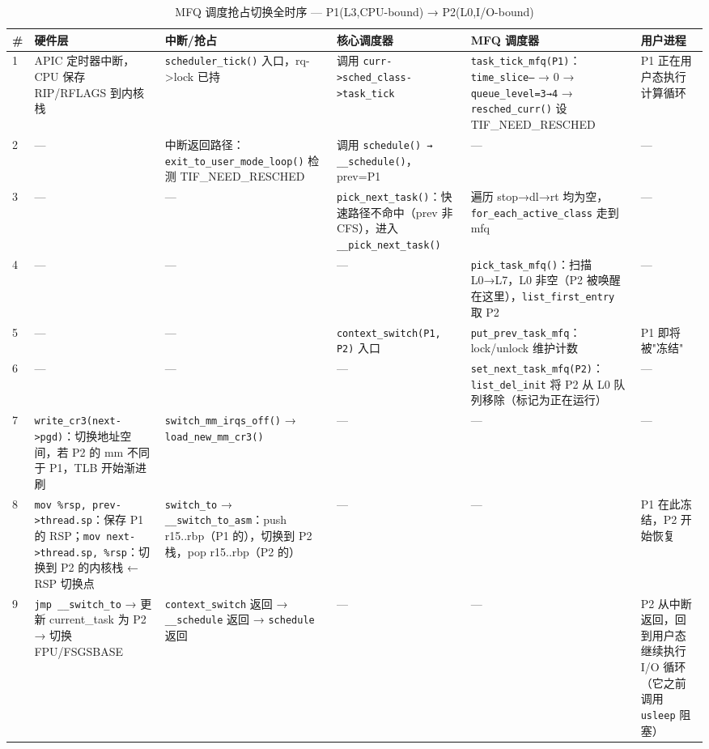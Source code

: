 \documentclass[a4paper]{article}
\begin{document}
\begin{table}[htbp]
\centering
\footnotesize
\caption{MFQ 调度抢占切换全时序 — P1(L3,CPU-bound) → P2(L0,I/O-bound)}
\label{tab:mfq_timing}
\begin{tabular}{p{0.5cm}p{2.5cm}p{2.5cm}p{3cm}p{4cm}p{2cm}}
\toprule
\textbf{\#} & \textbf{硬件层} & \textbf{中断/抢占} & \textbf{核心调度器} & \textbf{MFQ 调度器} & \textbf{用户进程} \\
\midrule
1 & APIC 定时器中断，CPU 保存 RIP/RFLAGS 到内核栈 & \texttt{scheduler\_tick()} 入口，rq->lock 已持 & 调用 \texttt{curr->sched\_class->task\_tick} & \texttt{task\_tick\_mfq(P1)}：\texttt{time\_slice--} → 0 → \texttt{queue\_level=3→4} → \texttt{resched\_curr()} 设 TIF\_NEED\_RESCHED & P1 正在用户态执行计算循环 \\
2 & — & 中断返回路径：\texttt{exit\_to\_user\_mode\_loop()} 检测 TIF\_NEED\_RESCHED & 调用 \texttt{schedule() → \_\_schedule()}，prev=P1 & — & — \\
3 & — & — & \texttt{pick\_next\_task()}：快速路径不命中（prev 非 CFS），进入 \texttt{\_\_pick\_next\_task()} & 遍历 stop→dl→rt 均为空，\texttt{for\_each\_active\_class} 走到 mfq & — \\
4 & — & — & — & \texttt{pick\_task\_mfq()}：扫描 L0→L7，L0 非空（P2 被唤醒在这里），\texttt{list\_first\_entry} 取 P2 & — \\
5 & — & — & \texttt{context\_switch(P1, P2)} 入口 & \texttt{put\_prev\_task\_mfq}：lock/unlock 维护计数 & P1 即将被"冻结" \\
6 & — & — & — & \texttt{set\_next\_task\_mfq(P2)}：\texttt{list\_del\_init} 将 P2 从 L0 队列移除（标记为正在运行） & — \\
7 & \texttt{write\_cr3(next->pgd)}：切换地址空间，若 P2 的 mm 不同于 P1，TLB 开始渐进刷 & \texttt{switch\_mm\_irqs\_off()} → \texttt{load\_new\_mm\_cr3()} & — & — & — \\
8 & \texttt{mov \%rsp, prev->thread.sp}：保存 P1 的 RSP；\texttt{mov next->thread.sp, \%rsp}：切换到 P2 的内核栈 ← RSP 切换点 & \texttt{switch\_to} → \texttt{\_\_switch\_to\_asm}：push r15..rbp（P1 的），切换到 P2 栈，pop r15..rbp（P2 的）& — & — & P1 在此冻结，P2 开始恢复 \\
9 & \texttt{jmp \_\_switch\_to} → 更新 current\_task 为 P2 → 切换 FPU/FSGSBASE & \texttt{context\_switch} 返回 → \texttt{\_\_schedule} 返回 → \texttt{schedule} 返回 & — & — & P2 从中断返回，回到用户态继续执行 I/O 循环（它之前调用 \texttt{usleep} 阻塞）\\
\bottomrule
\end{tabular}
\end{table}
\end{document}
